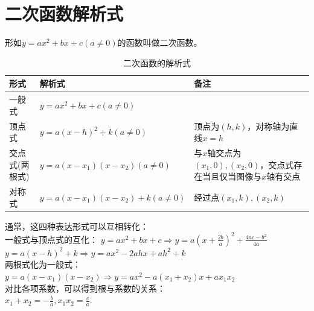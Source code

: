 \documentclass{ecnuthesis}
\begin{document}
\section{二次函数解析式}
\begin{knowledge}
    形如$y=ax^2+bx+c(a\ne 0)$的函数叫做二次函数。
\end{knowledge}
\begin{table}[H]
\centering
\caption{二次函数的解析式}
\begin{tabular}{l|l|p{7cm}}
\hline
\hline
形式 & 解析式 & 备注 \\
\hline
一般式 & $y=ax^2+bx+c(a\ne 0)$ & \\
\hline
顶点式 & $y=a(x-h)^2+k(a \ne 0)$ & 顶点为$(h,k)$，对称轴为直线$x=h$ \\
\hline
交点式(两根式) & $y=a(x-x_1)(x-x_2)(a \ne 0)$ & 与$x$轴交点为$(x_1,0),(x_2,0)$，交点式存在当且仅当图像与$x$轴有交点\\
\hline
对称式 & $y=a(x-x_1)(x-x_2)+k (a \ne 0)$ & 经过点$(x_1,k),(x_2,k)$ \\
\hline
\hline
\end{tabular}
\end{table}
\begin{knowledge}
    通常，这四种表达形式可以互相转化：\\
    一般式与顶点式的互化：
    $y=ax^2+bx+c \Rightarrow y=a(x+\frac{2b}{a})^2+\frac{4ac-b^2}{4a}$ \\
    $y=a(x-h)^2+k \Rightarrow y=ax^2-2ahx+ah^2+k$ \\
    两根式化为一般式：\\
    $y=a(x-x_1)(x-x_2) \Rightarrow y=ax^2-a(x_1+x_2)x+ax_1x_2$ \\
    对比各项系数，可以得到根与系数的关系：\\
    $x_1+x_2=-\frac{b}{a},x_1x_2=\frac{c}{a}$.
\end{knowledge}
\clearpage
\end{document}
